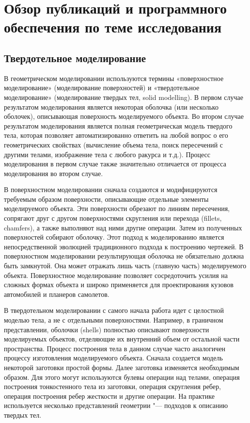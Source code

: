 \chapter{Обзор публикаций и программного обеспечения по теме исследования} \label{chapt1}

\section{Твердотельное моделирование} \label{solid_modeling}

В геометрическом моделировании используются термины «поверхностное моделирование» (моделирование поверхностей) и «твердотельное моделирование» (моделирование твердых тел, solid modelling). В первом случае результатом моделирования является некоторая оболочка (или несколько оболочек), описывающая поверхность моделируемого объекта. Во втором случае результатом моделирования является полная геометрическая модель твердого тела, которая позволяет автоматизированно ответить на любой вопрос о его геометрических свойствах (вычисление объема тела, поиск пересечений с другими телами, изображение тела с любого ракурса и т.д.). Процесс моделирования в первом случае также значительно отличается от процесса моделирования во втором случае.

В поверхностном моделировании сначала создаются и модифицируются требуемым образом поверхности, описывающие отдельные элементы моделируемого объекта. Эти поверхности обрезают по линиям пересечения, сопрягают друг с другом поверхностями скругления или перехода (fillets, chamfers), а также выполняют над ними другие операции. Затем из полученных поверхностей собирают оболочку. Этот подход к моделированию является непосредственной эволюцией традиционного подхода к построению чертежей. В поверхностном моделировании результирующая оболочка не обязательно должна быть замкнутой. Она может отражать лишь часть (главную часть) моделируемого объекта. Поверхностное моделирование позволяет сосредоточить усилия на сложных формах объекта и широко применяется для проектирования кузовов автомобилей и планеров самолетов.

В твердотельном моделировании с самого начала работа идет с целостной моделью тела, а не с отдельными поверхностями. Например, в граничном представлении, оболочки (shells) полностью описывают поверхности моделируемых объектов, отделяющие их внутренний объем от остальной части пространства. Процесс построения тела в данном случае часто аналогичен процессу изготовления моделируемого объекта. Сначала создается модель некоторой заготовки простой формы. Далее заготовка изменяется необходимым образом. Для этого могут используются булевы операции над телами, операция построения тонкостенного тела из заготовки, операция скругления ребер, операция построения ребер жесткости и другие операции. На практике используется несколько представлений геометрии "--- подходов к описанию твердых тел.


